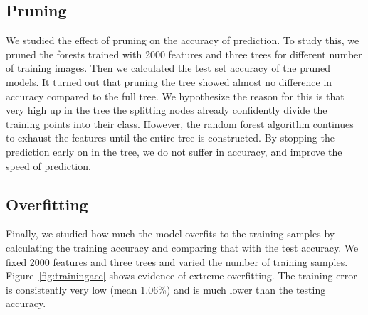\subsection{Pruning}
We studied the effect of pruning on the accuracy of prediction. To study this, we pruned the forests trained with 2000 features and three trees for different number of training images. Then we calculated the test set accuracy of the pruned models. It turned out that pruning the tree showed almost no difference in accuracy compared to the full tree. We hypothesize the reason for this is that very high up in the tree the splitting nodes already confidently divide the training points into their class. However, the random forest algorithm continues to exhaust the features until the entire tree is constructed. By stopping the prediction early on in the tree, we do not suffer in accuracy, and improve the speed of prediction.


\subsection{Overfitting}
Finally, we studied how much the model overfits to the training samples by calculating the training accuracy and comparing that with the test accuracy. We fixed 2000 features and three trees and varied the number of training samples. Figure~\ref{fig:trainingacc} shows evidence of extreme overfitting. The training error is consistently very low (mean 1.06\%) and is much lower than the testing accuracy. 

